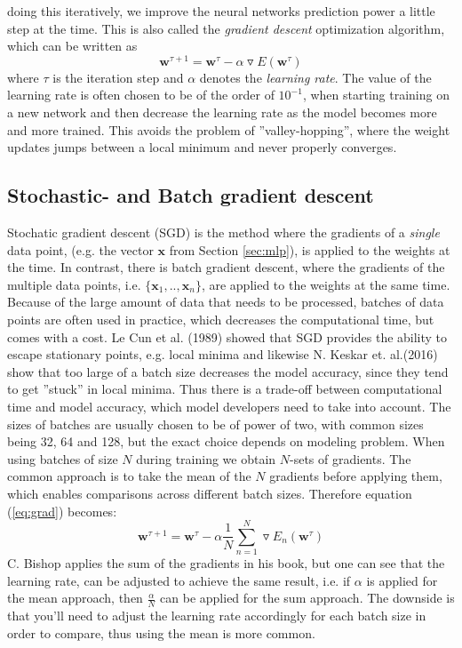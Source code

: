 doing this iteratively, we improve the neural networks prediction power a little
step at the time. This is also called the \emph{gradient descent} optimization
algorithm, which can be written as
\begin{equation}
\label{eq:grad}
\textbf{w}^{\tau + 1} = \textbf{w}^{\tau} - \alpha \triangledown
E(\textbf{w}^\tau)
\end{equation}
where $\tau$ is the iteration step and $\alpha$ denotes the \emph{learning
	rate}. The value of the learning rate is often chosen to be of the order of
$10^{-1}$, when starting training on a new network and then decrease the
learning rate as the model becomes more and more trained. This avoids the
problem of ''valley-hopping'', where the weight updates jumps between a local
minimum and never properly converges. 

\subsection{Stochastic- and Batch gradient descent}
\label{batch}
Stochatic gradient descent (SGD) is the method where the gradients of a
\emph{single} data point, (e.g. the vector $\boldsymbol{x}$ from Section
\ref{sec:mlp}), is applied to the weights at the time. In contrast, there is
batch gradient descent, where the gradients of the multiple data points, i.e.
$\{\boldsymbol{x}_1, .., \boldsymbol{x}_n\} $, are applied to the weights at the
same time. Because of the large amount of data that needs to be processed,
batches of data points are often used in practice, which decreases the
computational time, but comes with a cost. Le Cun et al. (1989) showed that SGD
provides the ability to escape stationary points, e.g. local minima and likewise
N. Keskar et. al.(2016) show that too large of a batch size decreases the model
accuracy, since they tend to get ''stuck'' in local minima. Thus there is a
trade-off between computational time and model accuracy, which model developers
need to take into account. The sizes of batches are usually chosen to be of
power of two, with common sizes being 32, 64 and 128, but the exact choice
depends on modeling problem. When using batches of size $N$ during training we
obtain $N$-sets of gradients. The common approach is to take the mean of the $N$
gradients before applying them, which enables comparisons across different batch
sizes.
Therefore equation (\ref{eq:grad}) becomes:
\begin{equation}
\label{eq:update}
\textbf{w}^{\tau + 1} = \textbf{w}^{\tau} - \alpha \frac{1}{N} \sum_{n = 1}^N
\triangledown E_n(\textbf{w}^\tau)
\end{equation}
C. Bishop applies the sum of the gradients in his
book\cite{Bishop:2006:PRM:1162264}, but one can see that the learning rate, can
be adjusted to achieve the same result, i.e. if $\alpha$ is applied for the mean
approach, then $\frac{\alpha}{N}$ can be applied for the sum approach. The
downside is that you'll need to adjust the learning rate accordingly for each
batch size in order to compare, thus using the mean is more common.  

